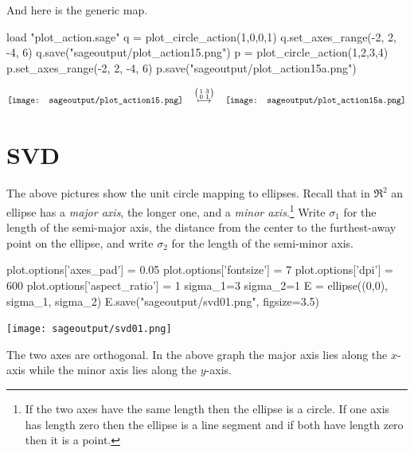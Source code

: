 And here is the generic map.
\begin{sageoutput}[d,0,4;d,5,7]
load "plot_action.sage"
q = plot_circle_action(1,0,0,1) 
q.set_axes_range(-2, 2, -4, 6) 
q.save("sageoutput/plot_action15.png")
p = plot_circle_action(1,2,3,4) 
p.set_axes_range(-2, 2, -4, 6) 
p.save("sageoutput/plot_action15a.png")
\end{sageoutput}
\begin{equation*}
  \vcenteredhbox{\texttt{[image: sageoutput/plot\_action15.png]}}
  \quad\mapsunder{\big (\begin{smallmatrix} 1 &3 \\ 0 &1 \end{smallmatrix}\big )}\quad
  \vcenteredhbox{\texttt{[image: sageoutput/plot\_action15a.png]}}
\end{equation*}



\section{SVD}
The above pictures show the unit circle mapping to ellipses.
Recall that in $\Re^2$ an ellipse has a \textit{major axis}, 
the longer one, and a 
\textit{minor axis}.\footnote{If the two axes have the same length 
then the ellipse is a circle.
If one axis has length zero then the ellipse is a line segment 
and if both have length zero then it is a point.}
Write $\sigma_1$ for the length of the semi-major axis, 
the distance from the center to the furthest-away point on the ellipse,
and write $\sigma_2$ for the length of the semi-minor axis.
\begin{sageoutput}[d,0,4]
plot.options['axes_pad'] = 0.05
plot.options['fontsize'] = 7
plot.options['dpi'] = 600
plot.options['aspect_ratio'] = 1
sigma_1=3
sigma_2=1
E = ellipse((0,0), sigma_1, sigma_2)
E.save("sageoutput/svd01.png", figsize=3.5)
\end{sageoutput}
\begin{center}
  \texttt{[image: sageoutput/svd01.png]}
\end{center}
The two axes are orthogonal.
In the above graph the major axis lies along the $x$-axis while the
minor axis lies along the $y$-axis.

